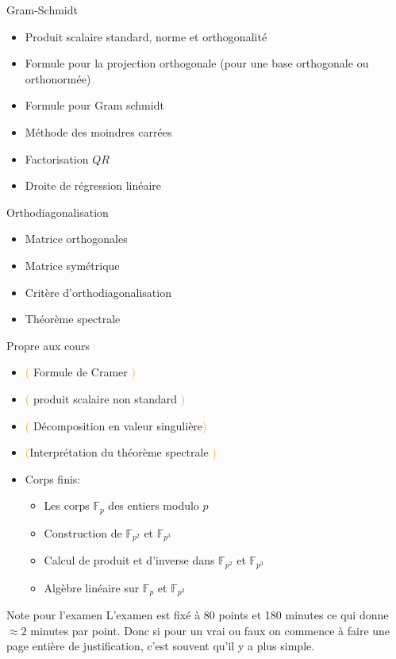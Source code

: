 \begin{parag}{Gram-Schmidt}
    \begin{itemize}
        \item Produit scalaire standard, norme et orthogonalité
        \item Formule pour la projection orthogonale (pour une base orthogonale ou orthonormée)
        \item Formule pour Gram schmidt
        \item Méthode des moindres carrées
        \item Factorisation $QR$
        \item Droite de régression linéaire
    \end{itemize}
\end{parag}
\begin{parag}{Orthodiagonalisation}
    \begin{itemize}
        \item Matrice orthogonales
        \item Matrice symétrique
        \item Critère d'orthodiagonalisation
        \item Théorème spectrale
    \end{itemize}
\end{parag}
\begin{parag}{Propre aux cours}
    \begin{itemize}
        \item \textcolor{orange}{(} Formule de Cramer \textcolor{orange}{)}
        \item \textcolor{orange}{(} produit scalaire non standard \textcolor{orange}{)}
        \item \textcolor{orange}{(} Décomposition en valeur singulière\textcolor{orange}{)}
        \item \textcolor{orange}{(}Interprétation du théorème spectrale \textcolor{orange}{)}
        \item Corps finis:
        \begin{itemize}
            \item Les corps $\mathbb{F}_p$ des entiers modulo $p$
            \item Construction de $\mathbb{F}_{p^2}$ et $\mathbb{F}_{p^3}$
            \item Calcul de produit et d'inverse dans $\mathbb{F}_{p^2}$ et $\mathbb{F}_{p^3}$
            \item Algèbre linéaire sur $\mathbb{F}_p$ et $\mathbb{F}_{p^2}$
        \end{itemize}
    \end{itemize}
\end{parag}
\begin{parag}{Note pour l'examen}
    L'examen est fixé à $80$ points et 180 minutes ce qui donne $\approx 2$ minutes par point. Donc si pour un vrai ou faux on commence à faire une page entière de justification, c'est souvent qu'il y a plus simple.
\end{parag}